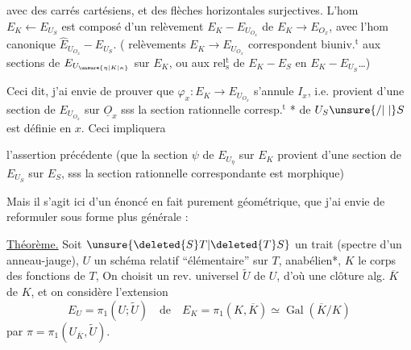 avec des carrés cartésiens, et des flèches horizontales surjectives. L'hom $E_K\longleftarrow E_{U_S}$ est composé d'un relèvement $E_K-E_{U_{O_x}}$ de $E_K\longrightarrow E_{O_x}$, avec l'hom canonique $\widehat E_{U_{O_x}}-E_{U_S}$. (  relèvements $E_K\longrightarrow E_{U_{O_x}}$ correspondent biuniv.$^{\mathrm t}$ aux sections de $E_{U_{\unsure{\eta|K|\kappa}}}$ sur $E_K$, ou aux rel$^{\mathrm t}_{\mathrm s}$ de $E_K-E_S$ en $E_K-E_{U_S}$\ldots)

Ceci dit, j'ai envie de prouver que $\varphi_x:E_K\longrightarrow E_{U_{O_x}}$ s'annule  $I_x$, i.e. provient d'une section de $E_{U_{O_x}}$ sur $\underline O_x$ sss la section rationnelle corresp.$^{\mathrm t}$ * de $U_S\unsure{/|\mid}S$ est définie en $x$. Ceci impliquera

l'assertion précédente (que la section $\psi$ de $E_{U_\eta}$ sur $E_K$ provient d'une section de $E_{U_S}$ sur $E_S$, sss la section rationnelle correspondante est morphique)

Mais il s'agit ici d'un énoncé en fait purement géométrique, que j'ai envie de reformuler sous forme plus générale :

\uline{Théorème.}  Soit $\unsure{\deleted{S}T|\deleted{T}S}$ un trait (spectre d'un anneau-jauge), $U$ un schéma relatif ``élémentaire'' sur $T$, anabélien*, $K$ le corps des fonctions de $T$, On choisit un rev. universel $\widetilde U$ de $U$, d'où une clôture alg. $\overline K$ de $K$, et on considère l'extension
\[
E_U=\pi_1(U;\widetilde U)\quad\text{de}\quad E_K=\pi_1(K,\overline K)\simeq\operatorname{Gal}(\overline K/K)
\]
par $\pi=\pi_1(U_{\overline K},\widetilde U)$.   \unsure{\deleted{,}|,} 

